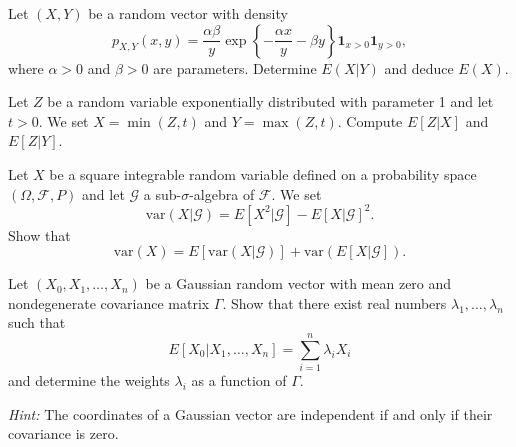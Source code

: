 \begin{exercise}
Let \((X, Y)\) be a random vector with density
\[p_{X,Y}(x, y) = \frac{\alpha\beta}{y} \exp\left\{-\frac{\alpha x}{y} - \beta y\right\}\mathbf{1}_{x>0}\mathbf{1}_{y>0},\]
where \(\alpha > 0\) and \(\beta > 0\) are parameters. Determine \(E(X|Y)\) and deduce \(E(X)\).
\end{exercise}

\begin{exercise}
Let \(Z\) be a random variable exponentially distributed with parameter 1 and let \(t > 0\). We set \(X = \min(Z, t)\) and \(Y = \max(Z, t)\). Compute \(E[Z | X]\) and \(E[Z | Y]\).
\end{exercise}

\begin{exercise}
Let \(X\) be a square integrable random variable defined on a probability space \((\Omega, \mathcal{F}, P)\) and let \(\mathcal{G}\) a sub-\(\sigma\)-algebra of \(\mathcal{F}\). We set
\[\text{var}(X | \mathcal{G}) = E[X^2| \mathcal{G}] - E[X | \mathcal{G}]^2.\]
Show that
\[\text{var}(X) = E[\text{var}(X | \mathcal{G})] + \text{var}(E[X | \mathcal{G}]).\]
\end{exercise}

\begin{exercise}
Let \((X_0, X_1, \ldots, X_n)\) be a Gaussian random vector with mean zero and nondegenerate covariance matrix \(\Gamma\). Show that there exist real numbers \(\lambda_1, \ldots, \lambda_n\) such that
\[E[X_0 | X_1, \ldots, X_n] = \sum_{i=1}^n \lambda_i X_i\]
and determine the weights \(\lambda_i\) as a function of \(\Gamma\).

\textit{Hint:} The coordinates of a Gaussian vector are independent if and only if their covariance is zero.
\end{exercise}